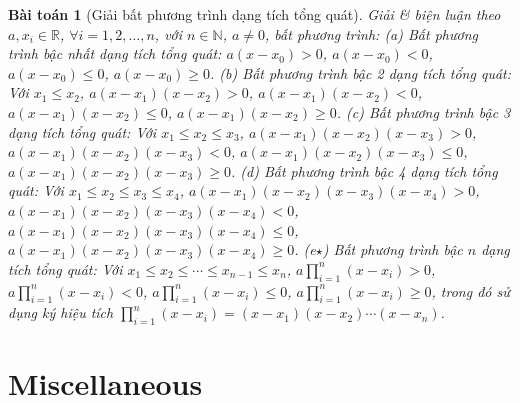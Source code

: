 \documentclass{article}
\newtheorem{baitoan}{Bài toán}
\begin{document}
\begin{baitoan}[Giải bất phương trình dạng tích tổng quát]
	Giải \& biện luận theo $a,x_i\in\mathbb{R}$, $\forall i = 1,2,\ldots,n$, với $n\in\mathbb{N}$, $a\ne0$, bất phương trình: (a) {\rm Bất phương trình bậc nhất dạng tích tổng quát:} $a(x - x_0) > 0$, $a(x - x_0) < 0$, $a(x - x_0)\le0$, $a(x - x_0)\ge0$. (b) {\rm Bất phương trình bậc 2 dạng tích tổng quát:} Với $x_1\le x_2$, $a(x - x_1)(x - x_2) > 0$, $a(x - x_1)(x - x_2) < 0$, $a(x - x_1)(x - x_2)\le0$, $a(x - x_1)(x - x_2)\ge0$. (c) {\rm Bất phương trình bậc 3 dạng tích tổng quát:} Với $x_1\le x_2\le x_3$, $a(x - x_1)(x - x_2)(x - x_3) > 0$, $a(x - x_1)(x - x_2)(x - x_3) < 0$, $a(x - x_1)(x - x_2)(x - x_3)\le0$, $a(x - x_1)(x - x_2)(x - x_3)\ge0$. (d) {\rm Bất phương trình bậc 4 dạng tích tổng quát:} Với $x_1\le x_2\le x_3\le x_4$, $a(x - x_1)(x - x_2)(x - x_3)(x - x_4) > 0$, $a(x - x_1)(x - x_2)(x - x_3)(x - x_4) < 0$, $a(x - x_1)(x - x_2)(x - x_3)(x - x_4)\le0$, $a(x - x_1)(x - x_2)(x - x_3)(x - x_4)\ge0$. (e$\star$) {\rm Bất phương trình bậc $n$ dạng tích tổng quát:} Với $x_1\le x_2\le\cdots\le x_{n-1}\le x_n$, $a\prod_{i=1}^n (x - x_i) > 0$, $a\prod_{i=1}^n (x - x_i) < 0$, $a\prod_{i=1}^n (x - x_i)\le0$, $a\prod_{i=1}^n (x - x_i)\ge0$, trong đó sử dụng ký hiệu tích $\prod_{i=1}^n (x - x_i) = (x - x_1)(x - x_2)\cdots(x - x_n)$.
\end{baitoan}


\section{Miscellaneous}


\printbibliography[heading=bibintoc]
\end{document}

